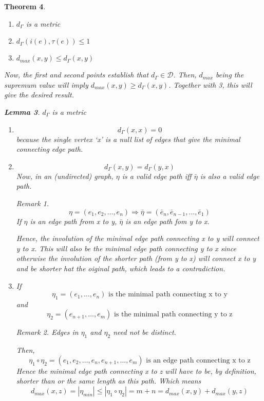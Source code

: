 \documentclass[a4paper,10pt]{book}
\newtheorem{theorem}{Theorem}[chapter]
\newtheorem{lemma}[theorem]{Lemma}
\theoremstyle{definition}
\theoremstyle{remark}
\newtheorem{remark}[theorem]{Remark}
\numberwithin{section}{chapter}
\numberwithin{equation}{chapter}
\begin{document}
\begin{theorem}
\begin{enumerate}
   \item $d_\Gamma$ is a metric
   \item $d_\Gamma (i(e),\tau (e))\leq 1$ 
   \item $d_{max}(x,y) \leq d_\Gamma(x,y)$
  \end{enumerate}
Now, the first and second points establish that $d_\Gamma \in \mathcal{D} $. Then, $d_{max}$ being the supremum value will imply $d_{max}(x,y) \geq d_\Gamma (x,y)$. Together with 3, this will give the desired result. 
  \begin{lemma}
   $d_\Gamma$ is a metric
   \proof
   \begin{enumerate}
    \item \[d_\Gamma(x,x) = 0\] because the single vertex `x' is a null list of edges that give the minimal connecting edge path.
    \item \[d_\Gamma(x,y) = d_\Gamma(y,x)\] Now, in an (undirected) graph, $\eta$ is a valid edge path iff $\bar{\eta}$ is also a valid edge path.
    \begin{remark}
     \[ \eta = (e_1,e_2,\dots,e_n) \Rightarrow \bar{\eta}=(\bar{e}_n,\bar{e}_{n-1},\dots,\bar{e}_1)\] 
     If $\eta$ is an edge path from x to y, $\bar{\eta}$ is an edge path fom y to x.
    \end{remark}
    Hence, the involution of the minimal edge path connecting x to y will connect y to x. This will also be the minimal edge path connecting y to x since otherwise the involution of the shorter path (from y to x) will connect x to y and be shorter hat the oiginal path, which leads to a contradiction.
    \item If \[
              \eta_1=(e_1,\dots,e_n) \text{ is the minimal path connecting x to y}\] and\[
              \eta_2=(e_{n+1},\dots,e_m) \text{ is the minimal path connecting y to z}
             \]
             \begin{remark}
              Edges in $\eta_1$ and $\eta_2$ need not be distinct.
             \end{remark}
             Then,\[
                   \eta_1 \circ \eta_2 = (e_1,e_2,\dots,e_n,e_{n+1},\dots,e_m) \text{ is an edge path connecting x to z}
                  \]
                  Hence the minimal edge path connecting x to z will have to be, by definition, shorter than or the same length as this path. Which means
                  \[
                   d_{max}(x,z)=|\eta_{min}|\leq |\eta_1 \circ \eta_2| =m+n =d_{max}(x,y)+d_{max}(y,z)
                  \]
                     \end{enumerate}

\end{lemma}
\end{theorem}
\end{document}
